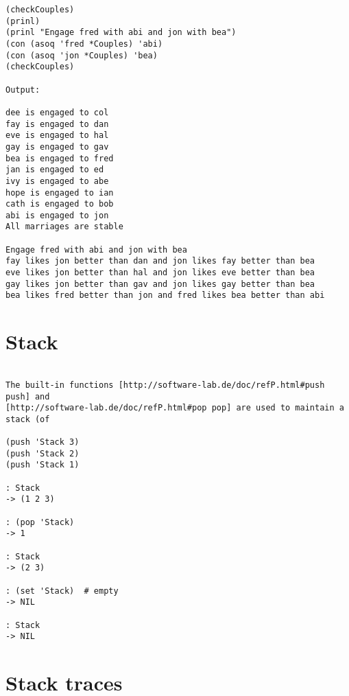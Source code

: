 \begin{verbatim}
(checkCouples)
(prinl)
(prinl "Engage fred with abi and jon with bea")
(con (asoq 'fred *Couples) 'abi)
(con (asoq 'jon *Couples) 'bea)
(checkCouples)

Output:

dee is engaged to col
fay is engaged to dan
eve is engaged to hal
gay is engaged to gav
bea is engaged to fred
jan is engaged to ed
ivy is engaged to abe
hope is engaged to ian
cath is engaged to bob
abi is engaged to jon
All marriages are stable

Engage fred with abi and jon with bea
fay likes jon better than dan and jon likes fay better than bea
eve likes jon better than hal and jon likes eve better than bea
gay likes jon better than gav and jon likes gay better than bea
bea likes fred better than jon and fred likes bea better than abi

\end{verbatim}

\section*{Stack}

\begin{verbatim}

The built-in functions [http://software-lab.de/doc/refP.html#push push] and
[http://software-lab.de/doc/refP.html#pop pop] are used to maintain a stack (of

(push 'Stack 3)
(push 'Stack 2)
(push 'Stack 1)

: Stack
-> (1 2 3)

: (pop 'Stack)
-> 1

: Stack
-> (2 3)

: (set 'Stack)  # empty
-> NIL

: Stack
-> NIL

\end{verbatim}

\section*{Stack traces}

